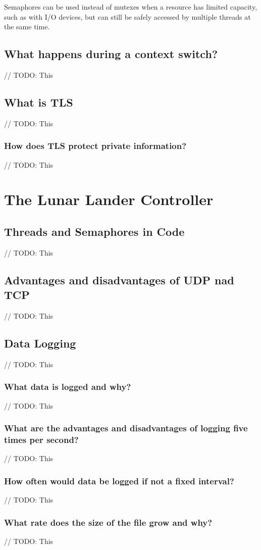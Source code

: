 \documentclass{article}
\begin{document}
    Semaphores can be used instead of mutexes when a resource has limited capacity,
    such as with I/O devices, but can still be safely accessed by multiple threads at the same time.

\subsection{What happens during a context switch?}
// TODO: This

\subsection{What is TLS}
// TODO: This
    \subsubsection{How does TLS protect private information?}
    // TODO: This

\section{The Lunar Lander Controller}{
    \renewcommand{\thesubsection}{\thesection.\alph{subsection}}

    \subsection{Threads and Semaphores in Code}
    // TODO: This

    \subsection{Advantages and disadvantages of UDP nad TCP}
    // TODO: This

    \subsection{Data Logging}
        // TODO: This

        \subsubsection{What data is logged and why?}
        // TODO: This

        \subsubsection{What are the advantages and disadvantages of logging five times per second?}
        // TODO: This

        \subsubsection{How often would data be logged if not a fixed interval?}
        // TODO: This

        \subsubsection{{What rate does the size of the file grow and why?}}
        // TODO: This
}
\end{document}
